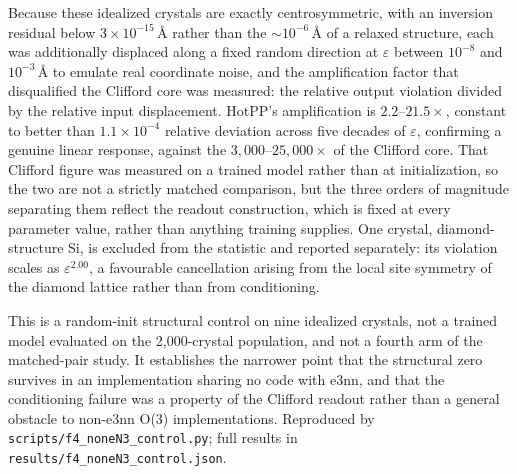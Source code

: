 Because these idealized crystals are exactly centrosymmetric, with an inversion residual below $3\times10^{-15}$\,\AA{} rather than the $\sim10^{-6}$\,\AA{} of a relaxed structure, each was additionally displaced along a fixed random direction at $\varepsilon$ between $10^{-8}$ and $10^{-3}$\,\AA{} to emulate real coordinate noise, and the amplification factor that disqualified the Clifford core was measured: the relative output violation divided by the relative input displacement. HotPP's amplification is $2.2$--$21.5\times$, constant to better than $1.1\times10^{-4}$ relative deviation across five decades of $\varepsilon$, confirming a genuine linear response, against the $3{,}000$--$25{,}000\times$ of the Clifford core. That Clifford figure was measured on a trained model rather than at initialization, so the two are not a strictly matched comparison, but the three orders of magnitude separating them reflect the readout construction, which is fixed at every parameter value, rather than anything training supplies. One crystal, diamond-structure Si, is excluded from the statistic and reported separately: its violation scales as $\varepsilon^{2.00}$, a favourable cancellation arising from the local site symmetry of the diamond lattice rather than from conditioning.

This is a random-init structural control on nine idealized crystals, not a trained model evaluated on the 2,000-crystal population, and not a fourth arm of the matched-pair study. It establishes the narrower point that the structural zero survives in an implementation sharing no code with e3nn, and that the conditioning failure was a property of the Clifford readout rather than a general obstacle to non-e3nn O(3) implementations. Reproduced by \texttt{scripts/f4\_noneN3\_control.py}; full results in \texttt{results/f4\_noneN3\_control.json}.
